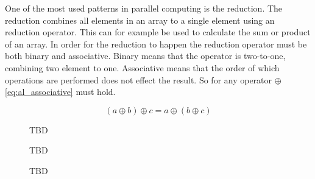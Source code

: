 One of the most used patterns in parallel computing is the reduction. The reduction combines all elements in an array to a single element using an reduction operator. This can for example be used to calculate the sum or product of an array. In order for the reduction to happen the reduction operator must be both binary and associative. Binary means that the operator is two-to-one, combining two element to one. Associative means that the order of which operations are performed does not effect the result. So for any operator $\oplus$ \cref{eq:al_associative} must hold.

\begin{equation} 
\label{eq:al_associative}
	(a \oplus b) \oplus c = a \oplus (b \oplus c)
\end{equation}



\begin{figure}[ht]
	\centering
	\caption{TBD}
	\label{fig:reduce_serial}
\end{figure}



\begin{figure}[ht]
	\centering
	\caption{TBD}
	\label{fig:reduce_parallel}
\end{figure}


\begin{figure}[ht]
	\centering
	\caption{TBD}
	\label{fig:reduce_parallel_example}
\end{figure}
